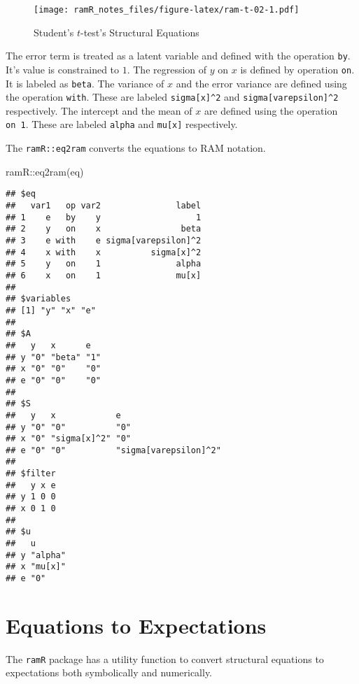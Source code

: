 \documentclass[
]{book}
\newenvironment{Shaded}{\begin{snugshade}}{\end{snugshade}}
\newcommand{\FunctionTok}[1]{\textcolor[rgb]{0.00,0.00,0.00}{#1}}
\newcommand{\NormalTok}[1]{#1}
\newcommand{\SpecialCharTok}[1]{\textcolor[rgb]{0.00,0.00,0.00}{#1}}
\theoremstyle{definition}
\theoremstyle{definition}
\theoremstyle{definition}
\theoremstyle{remark}
\begin{document}
\begin{figure}
\centering
\texttt{[image: ramR\_notes\_files/figure-latex/ram-t-02-1.pdf]}
\caption{\label{fig:ram-t-02}Student's \(t\)-test's Structural Equations}
\end{figure}

The error term is treated as a latent variable
and defined with the operation \texttt{by}.
It's value is constrained to \(1\).
The regression of \(y\) on \(x\) is defined by operation \texttt{on}.
It is labeled as \texttt{beta}.
The variance of \(x\) and the error variance
are defined using the operation \texttt{with}.
These are labeled \texttt{sigma{[}x{]}\^{}2} and \texttt{sigma{[}varepsilon{]}\^{}2} respectively.
The intercept and the mean of \(x\) are defined using the operation \texttt{on\ 1}.
These are labeled \texttt{alpha} and \texttt{mu{[}x{]}} respectively.

The \texttt{ramR::eq2ram} converts the equations to RAM notation.

\begin{Shaded}
\begin{Highlighting}[]
\NormalTok{ramR}\SpecialCharTok{::}\FunctionTok{eq2ram}\NormalTok{(eq)}
\end{Highlighting}
\end{Shaded}

\begin{verbatim}
## $eq
##   var1   op var2               label
## 1    e   by    y                   1
## 2    y   on    x                beta
## 3    e with    e sigma[varepsilon]^2
## 4    x with    x          sigma[x]^2
## 5    y   on    1               alpha
## 6    x   on    1               mu[x]
## 
## $variables
## [1] "y" "x" "e"
## 
## $A
##   y   x      e  
## y "0" "beta" "1"
## x "0" "0"    "0"
## e "0" "0"    "0"
## 
## $S
##   y   x            e                    
## y "0" "0"          "0"                  
## x "0" "sigma[x]^2" "0"                  
## e "0" "0"          "sigma[varepsilon]^2"
## 
## $filter
##   y x e
## y 1 0 0
## x 0 1 0
## 
## $u
##   u      
## y "alpha"
## x "mu[x]"
## e "0"
\end{verbatim}

\hypertarget{equations-to-expectations}{%
\section{Equations to Expectations}\label{equations-to-expectations}}

The \texttt{ramR} package has a utility function
to convert structural equations to expectations
both symbolically and numerically.
\end{document}
